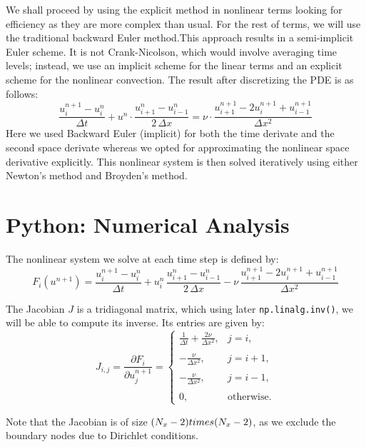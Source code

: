 \documentclass[12pt]{article}
\newcommand{\dfi}[1]{\frac{#1_{i+1} - #1_{i-1}}{2\,\Delta x}}
\newcommand{\dfii}[1]{\frac{#1_{i+1} - 2#1_i + #1_{i-1}}{\Delta x^2}}
\newcommand{\dt}[2]{\frac{u_{i}^{#2+1} - u_{i}^{#2}}{\Delta t}}
\begin{document}
We shall proceed by using the explicit method in nonlinear terms looking for efficiency as they are more complex than usual. For the rest of terms, we will use the traditional backward Euler method.This approach results in a semi-implicit Euler scheme. It is not Crank-Nicolson, which would involve averaging time levels; instead, we use an implicit scheme for the linear terms and an explicit scheme for the nonlinear convection.
 The result after discretizing the PDE is as follows:
\[
\dt{u}{n} + u^n \cdot \dfi{u^n} = \nu \cdot \dfii{u^{n+1}}
\]
Here we used Backward Euler (implicit) for both the time derivate and the second space derivate whereas we opted for approximating the nonlinear space derivative explicitly. This nonlinear system is then solved iteratively using either Newton's method and Broyden's method.

\section{Python: Numerical Analysis}

The nonlinear system we solve at each time step is defined by:
\[
F_i(u^{n+1})
= \dt{u}{n}
+ u_i^n\,\dfi{u^{n}}
- \nu\,\dfii{u^{n+1}}
\]


The Jacobian $J$ is a tridiagonal matrix, which using later \texttt{np.linalg.inv()}, we will be able to compute its inverse. Its entries are given by:
\[
J_{i,j}
= \frac{\partial F_i}{\partial u_j^{n+1}}
=
\begin{cases}
\displaystyle
\frac{1}{\Delta t} + \frac{2\nu}{\Delta x^2}, & j = i, \\\\[0.8em]
\displaystyle
- \frac{\nu}{\Delta x^2}, & j = i+1, \\\\[0.8em]
\displaystyle
- \frac{\nu}{\Delta x^2}, & j = i-1, \\\\[0.4em]
0, & \text{otherwise.}
\end{cases}
\]

Note that the Jacobian is of size $(N_x - 2) \\times (N_x - 2)$, as we exclude the boundary nodes due to Dirichlet conditions.
\end{document}
